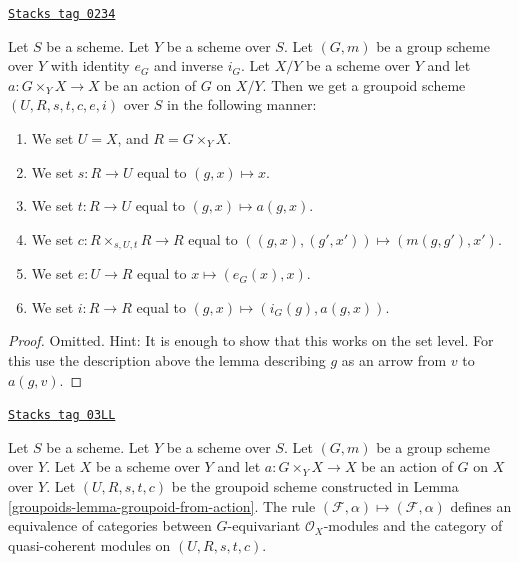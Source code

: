 \begin{lemma}
\label{groupoids-lemma-groupoid-from-action}
\href{https://stacks.math.columbia.edu/tag/0234}{\texttt{Stacks tag 0234}}

Let $S$ be a scheme.
Let $Y$ be a scheme over $S$.
Let $(G, m)$ be a group scheme over $Y$ with
identity $e_G$ and inverse $i_G$.
Let $X/Y$ be a scheme over $Y$ and let $a : G \times_Y X \to X$
be an action of $G$ on $X/Y$.
Then we get a groupoid scheme $(U, R, s, t, c, e, i)$ over $S$
in the following manner:
\begin{enumerate}
\item We set $U = X$, and $R = G \times_Y X$.
\item We set $s : R \to U$ equal to $(g, x) \mapsto x$.
\item We set $t : R \to U$ equal to $(g, x) \mapsto a(g, x)$.
\item We set $c : R \times_{s, U, t} R \to R$ equal to
$((g, x), (g', x')) \mapsto (m(g, g'), x')$.
\item We set $e : U \to R$ equal to $x \mapsto (e_G(x), x)$.
\item We set $i : R \to R$ equal to $(g, x) \mapsto (i_G(g), a(g, x))$.
\end{enumerate}
\end{lemma}

\begin{proof}
Omitted. Hint: It is enough to show that this works on the set
level. For this use the description above the lemma describing
$g$ as an arrow from $v$ to $a(g, v)$.
\end{proof}

\begin{lemma}
\label{groupoids-lemma-action-groupoid-modules}
\href{https://stacks.math.columbia.edu/tag/03LL}{\texttt{Stacks tag 03LL}}

Let $S$ be a scheme.
Let $Y$ be a scheme over $S$.
Let $(G, m)$ be a group scheme over $Y$.
Let $X$ be a scheme over $Y$ and let $a : G \times_Y X \to X$
be an action of $G$ on $X$ over $Y$. Let $(U, R, s, t, c)$ be
the groupoid scheme constructed in Lemma \ref{groupoids-lemma-groupoid-from-action}.
The rule
$(\mathcal{F}, \alpha) \mapsto (\mathcal{F}, \alpha)$ defines
an equivalence of categories between $G$-equivariant
$\mathcal{O}_X$-modules and the category of quasi-coherent
modules on $(U, R, s, t, c)$.
\end{lemma}


